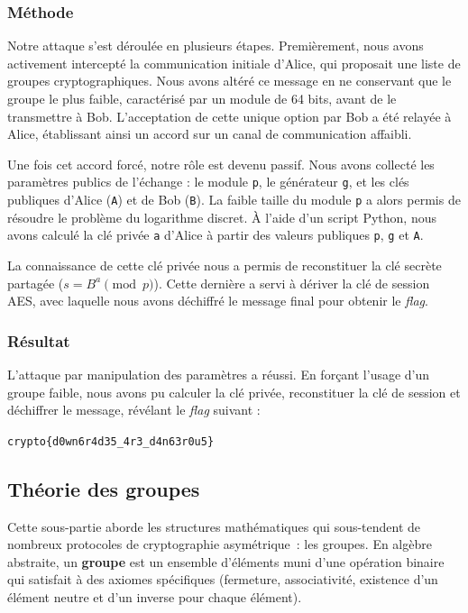 \documentclass[12pt, a4paper]{article}
\begin{document}
\subsubsection{Méthode}

Notre attaque s'est déroulée en plusieurs étapes. Premièrement, nous avons activement intercepté la communication initiale d'Alice, qui proposait une liste de groupes cryptographiques. Nous avons altéré ce message en ne conservant que le groupe le plus faible, caractérisé par un module de 64 bits, avant de le transmettre à Bob. L'acceptation de cette unique option par Bob a été relayée à Alice, établissant ainsi un accord sur un canal de communication affaibli.

Une fois cet accord forcé, notre rôle est devenu passif. Nous avons collecté les paramètres publics de l'échange : le module \texttt{p}, le générateur \texttt{g}, et les clés publiques d'Alice (\texttt{A}) et de Bob (\texttt{B}). La faible taille du module \texttt{p} a alors permis de résoudre le problème du logarithme discret. À l'aide d'un script Python, nous avons calculé la clé privée \texttt{a} d'Alice à partir des valeurs publiques \texttt{p}, \texttt{g} et \texttt{A}.

La connaissance de cette clé privée nous a permis de reconstituer la clé secrète partagée ($s = B^a \pmod{p}$). Cette dernière a servi à dériver la clé de session AES, avec laquelle nous avons déchiffré le message final pour obtenir le \textit{flag}.

\subsubsection{Résultat}

L'attaque par manipulation des paramètres a réussi. En forçant l'usage d'un groupe faible, nous avons pu calculer la clé privée, reconstituer la clé de session et déchiffrer le message, révélant le \textit{flag} suivant :

\begin{center} \texttt{crypto\{d0wn6r4d35\_4r3\_d4n63r0u5\}} \end{center}

        \subsection{Théorie des groupes}
        
            Cette sous-partie aborde les structures mathématiques qui sous-tendent de nombreux protocoles de cryptographie asymétrique~: les groupes. En algèbre abstraite, un \textbf{groupe} est un ensemble d'éléments muni d'une opération binaire qui satisfait à des axiomes spécifiques (fermeture, associativité, existence d'un élément neutre et d'un inverse pour chaque élément).
            
\end{document}
